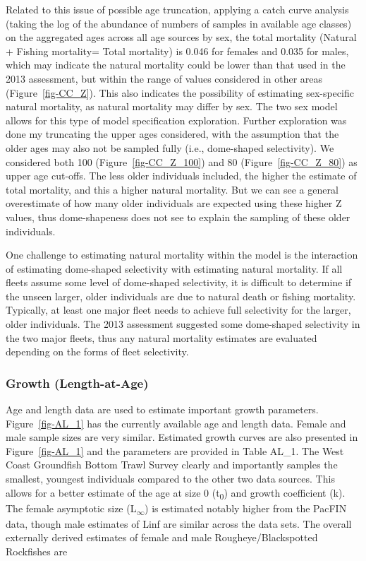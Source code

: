 \documentclass[
]{scrartcl}
\begin{document}
Related to this issue of possible age truncation, applying a catch curve
analysis (taking the log of the abundance of numbers of samples in
available age classes) on the aggregated ages across all age sources by
sex, the total mortality (Natural + Fishing mortality= Total mortality)
is 0.046 for females and 0.035 for males, which may indicate the natural
mortality could be lower than that used in the 2013 assessment, but
within the range of values considered in other areas
(Figure~\ref{fig-CC_Z}). This also indicates the possibility of
estimating sex-specific natural mortality, as natural mortality may
differ by sex. The two sex model allows for this type of model
specification exploration. Further exploration was done my truncating
the upper ages considered, with the assumption that the older ages may
also not be sampled fully (i.e., dome-shaped selectivity). We considered
both 100 (Figure~\ref{fig-CC_Z_100}) and 80 (Figure~\ref{fig-CC_Z_80})
as upper age cut-offs. The less older individuals included, the higher
the estimate of total mortality, and this a higher natural mortality.
But we can see a general overestimate of how many older individuals are
expected using these higher Z values, thus dome-shapeness does not see
to explain the sampling of these older individuals.

One challenge to estimating natural mortality within the model is the
interaction of estimating dome-shaped selectivity with estimating
natural mortality. If all fleets assume some level of dome-shaped
selectivity, it is difficult to determine if the unseen larger, older
individuals are due to natural death or fishing mortality. Typically, at
least one major fleet needs to achieve full selectivity for the larger,
older individuals. The 2013 assessment suggested some dome-shaped
selectivity in the two major fleets, thus any natural mortality
estimates are evaluated depending on the forms of fleet selectivity.

\subsubsection{Growth (Length-at-Age)}\label{growth-length-at-age}

Age and length data are used to estimate important growth parameters.
Figure~\ref{fig-AL_1} has the currently available age and length data.
Female and male sample sizes are very similar. Estimated growth curves
are also presented in Figure~\ref{fig-AL_1} and the parameters are
provided in Table AL\_1. The West Coast Groundfish Bottom Trawl Survey
clearly and importantly samples the smallest, youngest individuals
compared to the other two data sources. This allows for a better
estimate of the age at size 0 (t\textsubscript{0}) and growth
coefficient (k). The female asymptotic size
(L\textsubscript{\(\infty\)}) is estimated notably higher from the
PacFIN data, though male estimates of Linf are similar across the data
sets. The overall externally derived estimates of female and male
Rougheye/Blackspotted Rockfishes are
\end{document}

